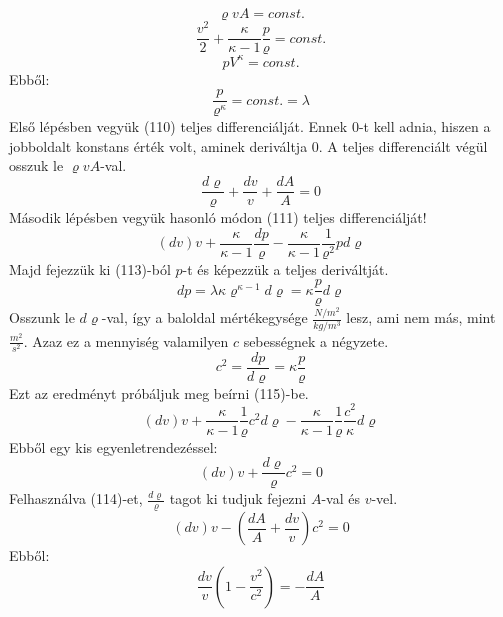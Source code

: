\documentclass[a4paper,12pt]{article}
\begin{document}
\begin{equation}
\varrho vA=const.
\end{equation}
\begin{equation}
\frac{v^2}{2}+\frac{\kappa}{\kappa-1}\frac{p}{\varrho}=const.
\end{equation}
\begin{equation}
pV^{\kappa}=const.
\end{equation}
Ebből:
\begin{equation}
\frac{p}{\varrho^{\kappa}}=const.=\lambda
\end{equation}
Első lépésben vegyük (110) teljes differenciálját. Ennek 0-t kell adnia, hiszen a jobboldalt konstans érték volt, aminek deriváltja 0. A teljes differenciált végül osszuk le $\varrho vA$-val.
\begin{equation}
\frac{d\varrho}{\varrho}+\frac{dv}{v}+\frac{dA}{A}=0
\end{equation}
Második lépésben vegyük hasonló módon (111) teljes differenciálját!
\begin{equation}
(dv)v+\frac{\kappa}{\kappa-1}\frac{dp}{\varrho}-\frac{\kappa}{\kappa-1}\frac{1}{\varrho^2}pd\varrho
\end{equation}
Majd fejezzük ki (113)-ból $p$-t és képezzük a teljes deriváltját.
\begin{equation}
dp=\lambda\kappa\varrho^{\kappa-1}d\varrho=\kappa\frac{p}{\varrho}d\varrho
\end{equation}
Osszunk le $d\varrho$-val, így a baloldal mértékegysége $\frac{N/m^2}{kg/m^3}$ lesz, ami nem más, mint $\frac{m^2}{s^2}$. Azaz ez a mennyiség valamilyen $c$ sebességnek a négyzete.
\begin{equation}
c^2=\frac{dp}{d\varrho}=\kappa\frac{p}{\varrho}
\end{equation}
Ezt az eredményt próbáljuk meg beírni (115)-be.
\begin{equation}
(dv)v+\frac{\kappa}{\kappa-1}\frac{1}{\varrho}c^2d\varrho-\frac{\kappa}{\kappa-1}\frac{1}{\varrho}\frac{c^2}{\kappa}d\varrho
\end{equation}
Ebből egy kis egyenletrendezéssel:
\begin{equation}
(dv)v+\frac{d\varrho}{\varrho}c^2=0
\end{equation}
Felhasználva (114)-et, $\frac{d\varrho}{\varrho}$ tagot ki tudjuk fejezni $A$-val és $v$-vel.
\begin{equation}
(dv)v-\left(\frac{dA}{A}+\frac{dv}{v}\right)c^2=0
\end{equation}
Ebből:
\begin{equation}
\frac{dv}{v}\left(1-\frac{v^2}{c^2}\right)=-\frac{dA}{A}
\end{equation}
\end{document}
